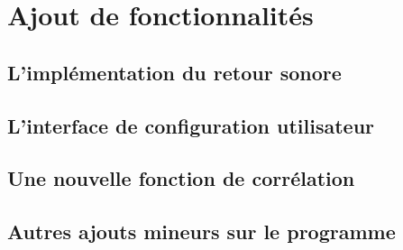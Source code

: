 \section{Ajout de fonctionnalités}

\subsection{L'implémentation du retour sonore}

\subsection{L'interface de configuration utilisateur}

\subsection{Une nouvelle fonction de corrélation}

\subsection{Autres ajouts mineurs sur le programme}
